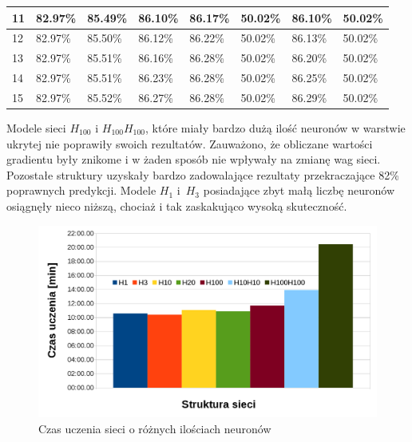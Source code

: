 \begin{table}[H]
\begin{tabular}{|l|l|l|l|l|l|l|l|}
11             & 82.97\%          & 85.49\%          & 86.10\%           & 86.17\%           & 50.02\%            & 86.10\%                 & 50.02\%                   \\ \hline
12             & 82.97\%          & 85.50\%          & 86.12\%           & 86.22\%           & 50.02\%            & 86.13\%                 & 50.02\%                   \\ \hline
13             & 82.97\%          & 85.51\%          & 86.16\%           & 86.28\%           & 50.02\%            & 86.20\%                 & 50.02\%                   \\ \hline
14             & 82.97\%          & 85.51\%          & 86.23\%           & 86.28\%           & 50.02\%            & 86.25\%                 & 50.02\%                   \\ \hline
15             & 82.97\%          & 85.52\%          & 86.27\%           & 86.28\%           & 50.02\%            & 86.29\%                 & 50.02\%                   \\ \hline
\end{tabular}
\end{table}

Modele sieci $H_{100}$ i $H_{100}H_{100}$, które miały bardzo dużą ilość neuronów w warstwie ukrytej nie poprawiły swoich rezultatów. Zauważono, że obliczane wartości gradientu były znikome i w żaden sposób nie wpływały na zmianę wag sieci. Pozostałe struktury uzyskały bardzo zadowalające rezultaty przekraczające 82\% poprawnych predykcji. Modele $H_1$ i~$H_3$ posiadające zbyt małą liczbę neuronów osiągnęły nieco niższą, chociaż i tak zaskakująco wysoką skuteczność.

\begin{figure}
\includegraphics[width=\textwidth]{time_h.png}
\caption{Czas uczenia sieci o różnych ilościach neuronów}
\label{fig:timeh}
\end{figure}

